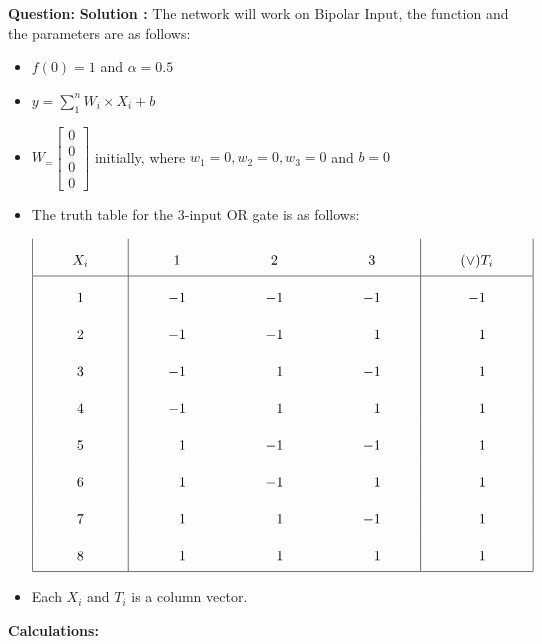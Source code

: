 \documentclass[12pt]{article}
\begin{document}
\textbf{Question: } 
\BlankLine	
\textbf{Solution :} The network will work on Bipolar Input, the function and the parameters are as follows:
\BlankLine
\begin{itemize}
	\item $ f(0) = 1 $ and $ \alpha =  0.5 $
	\item $ y = \displaystyle \sum_{1}^{n} W_i \times X_i + b$
	\item $ W_ = \begin{bmatrix}
		0 \\ 0 \\ 0 \\ 0
	\end{bmatrix}$ initially, where $w_1 = 0, w_2 = 0, w_3 = 0$ and $b = 0$
	
	\item The truth table for the 3-input OR gate is as follows:

		\[\arraycolsep=1cm\def\arraystretch{2.2}
		\begin{array}{|c|c c c|c|}
			X_i & 1 & 2 & 3 & (\lor) T_i\\
			\hline 
			1 & -1 & -1 & -1 & -1\\
			2 & -1 & -1 &  \phantom{-}1 &  \phantom{-}1\\ 
			3 & -1 &  \phantom{-}1 & -1 & \phantom{-} 1\\
			4 & -1 &  \phantom{-}1 &  \phantom{-}1 &  \phantom{-}1\\
			5 & \phantom{-}1 & -1 & -1 &  \phantom{-}1\\
			6 & \phantom{-}1 & -1 &  \phantom{-}1 &  \phantom{-}1\\
			7 & \phantom{-}1 &  \phantom{-}1 & -1 &  \phantom{-}1\\
			8 & \phantom{-}1 &  \phantom{-}1 &  \phantom{-}1 &  \phantom{-}1\\
			\hline
		\end{array}\]
	
	\item Each $X_i$ and $T_i$ is a column vector.
\end{itemize}
\BlankLine
\BlankLine
\textbf{Calculations: }
\end{document}
